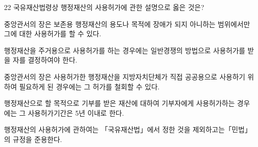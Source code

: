 \begin{question}{22}
국유재산법령상 행정재산의 사용허가에 관한 설명으로 옳은 것은?
\begin{choices}
  \item 중앙관서의 장은 보존용 행정재산의 용도나 목적에 장애가 되지 아니하는 범위에서만 그에 대한 사용허가를 할 수 있다.
  \item 행정재산을 주거용으로 사용허가를 하는 경우에는 일반경쟁의 방법으로 사용허가를 받을 자를 결정하여야 한다.
  \item 중앙관서의 장은 사용허가한 행정재산을 지방자치단체가 직접 공공용으로 사용하기 위하여 필요하게 된 경우에는 그 허가를 철회할 수 있다.
  \item 행정재산으로 할 목적으로 기부를 받은 재산에 대하여 기부자에게 사용허가하는 경우에는 그 사용허가기간은 5년 이내로 한다.
  \item 행정재산의 사용허가에 관하여는 「국유재산법」에서 정한 것을 제외하고는「민법」의 규정을 준용한다.
\end{choices}
\end{question}
